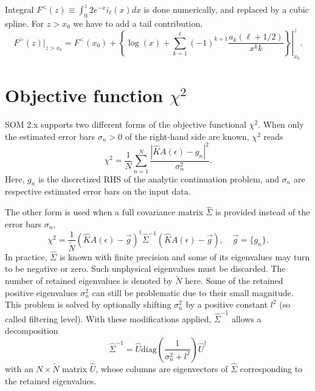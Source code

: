 \documentclass[]{article}
\begin{document}
Integral $F^<(z) \equiv \int_0^z 2 e^{-x} i_\ell(x) dx$ is done numerically,
and replaced by a cubic spline. For $z>x_0$ we have to add a tail contribution,
\begin{equation}
F^>(z)|_{z>x_0} = F^<(x_0) + \left.\left\{
\log(x) + \sum_{k=1}^\ell (-1)^{k+1}\frac{a_k(\ell+1/2)}{x^k k}
\right\}\right|_{x_0}^z.
\end{equation}

\section{Objective function $\chi^2$}
\label{objective_function}

SOM 2.x supports two different forms of the objective functional $\chi^2$. When only the estimated error bars $\sigma_n > 0$ of the right-hand side are known,
$\chi^2$ reads
\begin{equation}\label{objective_function:chi2}
    \chi^2 = \frac{1}{N} \sum_{n=1}^{N}
    \frac{|\hat K A(\epsilon) - g_n|^2}{\sigma^2_n}.
\end{equation}
Here, $g_n$ is the discretized RHS of the analytic continuation problem, and $\sigma_n$ are respective estimated error bars on the input data.

The other form is used when a full covariance matrix $\hat{\Sigma}$ is provided instead of the error bars $\sigma_n$,
\begin{equation}\label{objective_function:chi2_cov_matrix}
    \chi^2 = \frac{1}{\tilde N}
    (\hat K A(\epsilon) - \vec g)^\dagger
    \hat\Sigma^{-1}
    (\hat K A(\epsilon) - \vec g), \quad \vec g = \{g_n\}.
\end{equation}
In practice, $\hat{\Sigma}$ is known with finite precision and some of its eigenvalues may turn to be negative or zero. Such unphysical eigenvalues must be discarded. The number of retained eigenvalues is denoted by $\tilde N$ here. Some of the retained positive eigenvalues $\sigma_n^2$ can still be problematic due to their small magnitude. This problem is solved by optionally shifting $\sigma_n^2$ by a positive constant $l^2$ (so called filtering level). With these modifications applied, $\hat\Sigma^{-1}$ allows a decomposition
\begin{equation}
    \hat\Sigma^{-1} = \hat U \mathrm{diag}
    \left(\frac{1}{\sigma_n^2 + l^2}\right)
    \hat U^\dagger
\end{equation}
with an $N\times \tilde N$ matrix $\hat U$, whose columns are eigenvectors of $\hat{\Sigma}$ corresponding to the retained eigenvalues.
\end{document}
